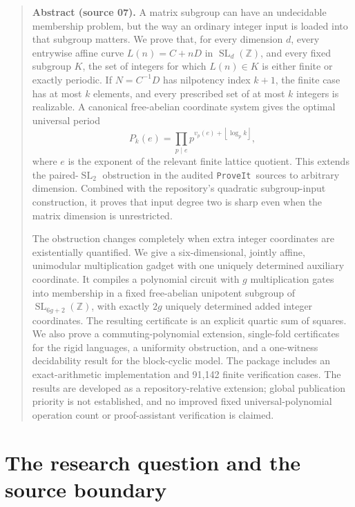\documentclass[11pt,letterpaper]{article}
\theoremstyle{definition}
\theoremstyle{remark}
\newcommand{\Z}{\mathbb Z}
\newcommand{\SL}{\operatorname{SL}}
\newcommand{\floor}[1]{\left\lfloor #1\right\rfloor}
\newcommand{\repo}{\texttt{ProveIt}}
\begin{document}
\begin{quote}\small
\textbf{Abstract (source 07).} A matrix subgroup can have an undecidable membership problem, but the way an ordinary integer input is loaded into that subgroup matters. We prove that, for every dimension $d$, every entrywise affine curve $L(n)=C+nD$ in $\SL_d(\Z)$, and every fixed subgroup $K$, the set of integers for which $L(n)\in K$ is either finite or exactly periodic. If $N=C^{-1}D$ has nilpotency index $k+1$, the finite case has at most $k$ elements, and every prescribed set of at most $k$ integers is realizable. A canonical free-abelian coordinate system gives the optimal universal period
\[
 P_k(e)=\prod_{p\mid e}p^{v_p(e)+\floor{\log_p k}},
\]
where $e$ is the exponent of the relevant finite lattice quotient. This extends the paired-$\SL_2$ obstruction in the audited \repo\ sources to arbitrary dimension. Combined with the repository's quadratic subgroup-input construction, it proves that input degree two is sharp even when the matrix dimension is unrestricted.

The obstruction changes completely when extra integer coordinates are existentially quantified. We give a six-dimensional, jointly affine, unimodular multiplication gadget with one uniquely determined auxiliary coordinate. It compiles a polynomial circuit with $g$ multiplication gates into membership in a fixed free-abelian unipotent subgroup of $\SL_{6g+2}(\Z)$, with exactly $2g$ uniquely determined added integer coordinates. The resulting certificate is an explicit quartic sum of squares. We also prove a commuting-polynomial extension, single-fold certificates for the rigid languages, a uniformity obstruction, and a one-witness decidability result for the block-cyclic model. The package includes an exact-arithmetic implementation and 91,142 finite verification cases. The results are developed as a repository-relative extension; global publication priority is not established, and no improved fixed universal-polynomial operation count or proof-assistant verification is claimed.
\end{quote}

\section{The research question and the source boundary}\label{gts:ai:sec:scope}
\end{document}
